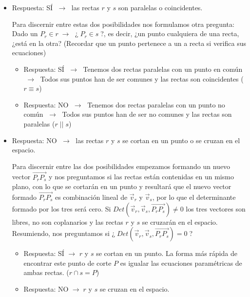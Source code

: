 \begin{itemize}
 
  \item Respuesta: SÍ $\; \to \;$ las rectas $r$ y $s$ son paralelas o coincidentes.
 
\noindent Para discernir entre estas dos posibilidades nos formulamos otra pregunta: Dado un $P_r \in r \; \to \;$ ¿$\;P_r \in s\;$?, es decir, ¿un punto cualquiera de una recta, ¿está en la otra? (Recordar que un punto pertenece a un a recta si verifica sus ecuaciones)
 
 	\begin{itemize}
	\item Respuesta: SÍ $\; \to \; $ Tenemos dos rectas paralelas con un punto en común $\; \to \; $ Todos sus puntos han de ser comunes y las rectas son coincidentes ($r \equiv s$)
 
 	\item  Respuesta: NO $\; \to \; $ Tenemos dos rectas paralelas con un punto no común  $\; \to \; $ Todos sus puntos han de ser no comunes y las rectas son paralelas ($r \; || \; s$) 
  	\end{itemize}
  
\item Respuesta: NO $\; \to \;$ las rectas $r$ y $s$ se cortan en un punto o se cruzan en el espacio.
  
  \noindent Para discernir entre las dos posibilidades empezamos formando un nuevo vector $\overrightarrow{P_rP_s}$ y nos preguntamos si las rectas están contenidas en un mismo plano, con lo que se cortarán en un punto y resultará que el nuevo vector formado $\overrightarrow{P_rP_s}$ es combinación lineal de $\vec v_r$ y $\vec v_s$, por lo que el determinante formado por los tres será cero. Si $Det(\vec v_r, \vec v_s, \overrightarrow{P_rP_s}) \neq 0$ los tres vectores son libres, no son coplanarios y las rectas $r$ y $s$ se cruzarán en el espacio. Resumiendo, nos preguntamos si ¿$\; Det(\vec v_r, \vec v_s, \overrightarrow{P_rP_s}) = 0 \;$?
  
  	\begin{itemize}
 	\item Respuesta: SÍ $\to$ $r$ y $s$ se cortan en un punto. La forma más rápida de encontrar este punto de corte $P$ es igualar las ecuaciones paramétricas de ambas rectas. ($r \cap s =P$)
  
 	\item Respuesta: NO $\to \; r $ y $s$ se cruzan en el espacio.
 	\end{itemize}
  
\end{itemize}
  
